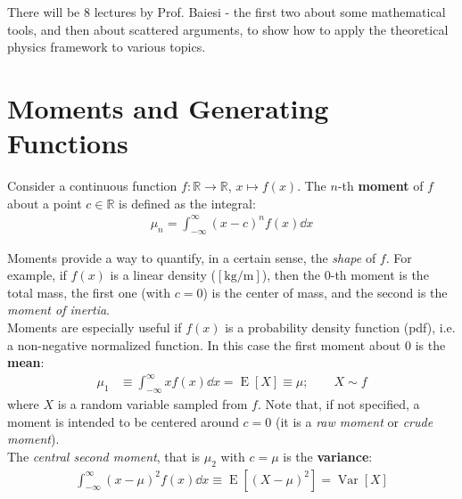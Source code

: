 \documentclass[../template.tex]{subfiles}
\begin{document}
There will be 8 lectures by Prof. Baiesi - the first two about some mathematical tools, and then about scattered arguments, to show how to apply the theoretical physics framework to various topics.\\

\section{Moments and Generating Functions}
Consider a continuous function $f\colon \mathbb{R} \to \mathbb{R}$, ${x} \mapsto f(x)$. The $n$-th \textbf{moment} of $f$ about a point $c \in \mathbb{R}$ is defined as the integral:
\begin{align*}
    \mu_n = \int_{-\infty}^{\infty} (x-c)^n f(x) \dd{x}
\end{align*}


Moments provide a way to quantify, in a certain sense, the \textit{shape} of $f$. For example, if $f(x)$ is a linear density ($[\si{\kilo\g\per\m}]$), then the $0$-th moment is the total mass, the first one (with $c=0$) is the center of mass, and the second is the \textit{moment of inertia}.\\

Moments are especially useful if $f(x)$ is a probability density function (pdf), i.e. a non-negative normalized function. In this case the first moment about $0$ is the \textbf{mean}:
\begin{align*}
    \mu_1 &\equiv \int_{-\infty}^{\infty} x f(x) \dd{x} = \operatorname{E}[X] \equiv \mu; \qquad X \sim f
\end{align*}
where $X$ is a random variable sampled from $f$. Note that, if not specified, a moment is intended to be centered around $c = 0$ (it is a \textit{raw moment} or \textit{crude moment}).\\

The \textit{central second moment}, that is $\mu_2$ with $c = \mu$ is the \textbf{variance}:
\begin{align*}
    \int_{-\infty}^{\infty} (x- \mu)^2 f(x) \dd{x} \equiv \operatorname{E} [(X- \mu)^2] = \operatorname{Var}[X] 
\end{align*}  
\end{document}
